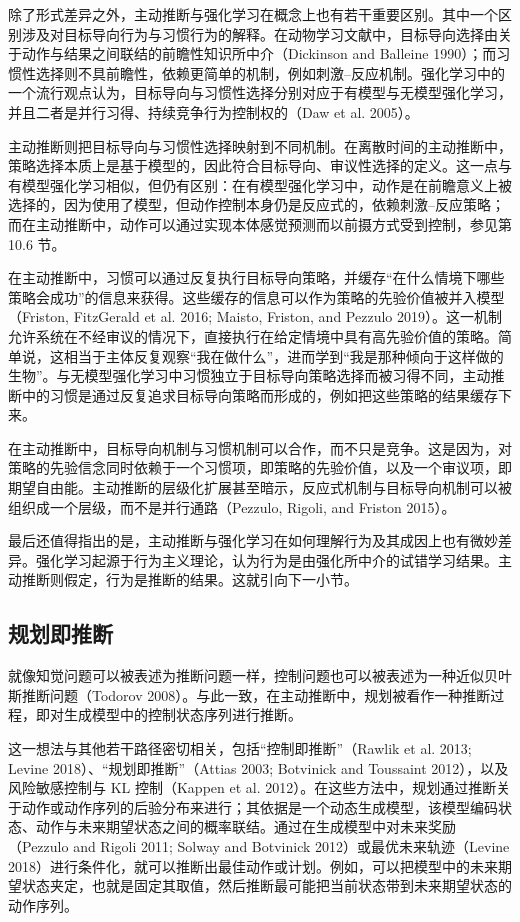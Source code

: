 除了形式差异之外，主动推断与强化学习在概念上也有若干重要区别。其中一个区别涉及对目标导向行为与习惯行为的解释。在动物学习文献中，目标导向选择由关于动作与结果之间联结的前瞻性知识所中介（Dickinson and Balleine 1990）；而习惯性选择则不具前瞻性，依赖更简单的机制，例如刺激--反应机制。强化学习中的一个流行观点认为，目标导向与习惯性选择分别对应于有模型与无模型强化学习，并且二者是并行习得、持续竞争行为控制权的（Daw et al. 2005）。

主动推断则把目标导向与习惯性选择映射到不同机制。在离散时间的主动推断中，策略选择本质上是基于模型的，因此符合目标导向、审议性选择的定义。这一点与有模型强化学习相似，但仍有区别：在有模型强化学习中，动作是在前瞻意义上被选择的，因为使用了模型，但动作控制本身仍是反应式的，依赖刺激--反应策略；而在主动推断中，动作可以通过实现本体感觉预测而以前摄方式受到控制，参见第 10.6 节。

在主动推断中，习惯可以通过反复执行目标导向策略，并缓存“在什么情境下哪些策略会成功”的信息来获得。这些缓存的信息可以作为策略的先验价值被并入模型（Friston, FitzGerald et al. 2016; Maisto, Friston, and Pezzulo 2019）。这一机制允许系统在不经审议的情况下，直接执行在给定情境中具有高先验价值的策略。简单说，这相当于主体反复观察“我在做什么”，进而学到“我是那种倾向于这样做的生物”。与无模型强化学习中习惯独立于目标导向策略选择而被习得不同，主动推断中的习惯是通过反复追求目标导向策略而形成的，例如把这些策略的结果缓存下来。

在主动推断中，目标导向机制与习惯机制可以合作，而不只是竞争。这是因为，对策略的先验信念同时依赖于一个习惯项，即策略的先验价值，以及一个审议项，即期望自由能。主动推断的层级化扩展甚至暗示，反应式机制与目标导向机制可以被组织成一个层级，而不是并行通路（Pezzulo, Rigoli, and Friston 2015）。

最后还值得指出的是，主动推断与强化学习在如何理解行为及其成因上也有微妙差异。强化学习起源于行为主义理论，认为行为是由强化所中介的试错学习结果。主动推断则假定，行为是推断的结果。这就引向下一小节。

\subsection{规划即推断}

就像知觉问题可以被表述为推断问题一样，控制问题也可以被表述为一种近似贝叶斯推断问题（Todorov 2008）。与此一致，在主动推断中，规划被看作一种推断过程，即对生成模型中的控制状态序列进行推断。

这一想法与其他若干路径密切相关，包括“控制即推断”（Rawlik et al. 2013; Levine 2018）、“规划即推断”（Attias 2003; Botvinick and Toussaint 2012），以及风险敏感控制与 KL 控制（Kappen et al. 2012）。在这些方法中，规划通过推断关于动作或动作序列的后验分布来进行；其依据是一个动态生成模型，该模型编码状态、动作与未来期望状态之间的概率联结。通过在生成模型中对未来奖励（Pezzulo and Rigoli 2011; Solway and Botvinick 2012）或最优未来轨迹（Levine 2018）进行条件化，就可以推断出最佳动作或计划。例如，可以把模型中的未来期望状态夹定，也就是固定其取值，然后推断最可能把当前状态带到未来期望状态的动作序列。

